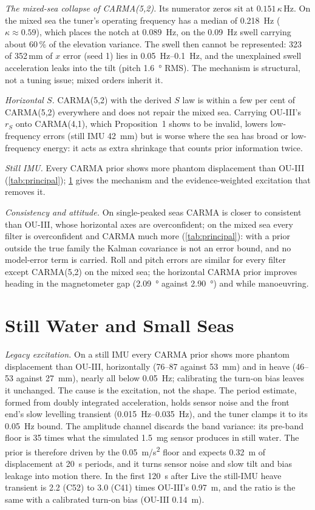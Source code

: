 \documentclass[conference]{IEEEtran}
\theoremstyle{bodysmall}
\begin{document}
\emph{The mixed-sea collapse of CARMA(5,2).} Its numerator zeros sit at
$0.151\,\kappa$\,Hz. On the mixed sea the tuner's operating frequency has a
median of \SI{0.218}{Hz} ($\kappa\approx0.59$), which places the notch at
\SI{0.089}{Hz}, on the \SI{0.09}{Hz} swell carrying about 60\,\% of the
elevation variance. The swell then cannot be represented: 323 of 352\,mm of
$x$ error (seed 1) lies in \SIrange{0.05}{0.1}{Hz}, and the unexplained swell
acceleration leaks into the tilt (pitch \SI{1.6}{\degree} RMS). The mechanism
is structural, not a tuning issue; mixed orders inherit it.

\emph{Horizontal $S$.} CARMA(5,2) with the derived $S$ law is within a few
per cent of CARMA(5,2) everywhere and does not repair the mixed sea. Carrying
OU-III's $r_S$ onto CARMA(4,1), which Proposition~1 shows to be invalid,
lowers low-frequency errors (still IMU \SI{42}{mm}) but is worse where the sea
has broad or low-frequency energy: it acts as extra shrinkage that counts
prior information twice.

\emph{Still IMU.} Every CARMA prior shows more phantom displacement than
OU-III (\cref{tab:principal}); \cref{sec:quiet} gives the mechanism and the
evidence-weighted excitation that removes it.

\emph{Consistency and attitude.} On single-peaked seas CARMA is closer to
consistent than OU-III, whose horizontal axes are overconfident; on the
mixed sea every filter is overconfident and CARMA much more
(\cref{tab:principal}): with a prior outside the true family the Kalman
covariance is not an error bound, and no model-error term is carried. Roll
and pitch errors are similar for every filter except CARMA(5,2) on the mixed
sea; the horizontal CARMA prior improves heading in the magnetometer gap
(\SI{2.09}{\degree} against \SI{2.90}{\degree}) and while manoeuvring.

\section{Still Water and Small Seas}
\label{sec:quiet}
\emph{Legacy excitation.} On a still IMU every CARMA prior shows more phantom
displacement than OU-III, horizontally (76--87 against \SI{53}{mm}) and in
heave (46--53 against \SI{27}{mm}), nearly all below \SI{0.05}{Hz};
calibrating the turn-on bias leaves it unchanged. The cause is the
excitation, not the shape. The period estimate, formed from doubly
integrated acceleration, holds sensor noise and the front end's slow
levelling transient (\SIrange{0.015}{0.035}{Hz}), and the tuner clamps it to
its \SI{0.05}{Hz} bound. The amplitude channel discards the band variance:
its pre-band floor is 35 times what the simulated \SI{1.5}{mg} sensor
produces in still water. The prior is therefore driven by the
\SI{0.05}{m/s^2} floor and expects \SI{0.32}{m} of displacement at
\SI{20}{s} periods, and it turns sensor noise and slow tilt and bias leakage
into motion there. In the first \SI{120}{s} after Live the still-IMU heave
transient is 2.2 (C52) to 3.0 (C41) times OU-III's \SI{0.97}{m}, and the
ratio is the same with a calibrated turn-on bias (OU-III \SI{0.14}{m}).
\end{document}
